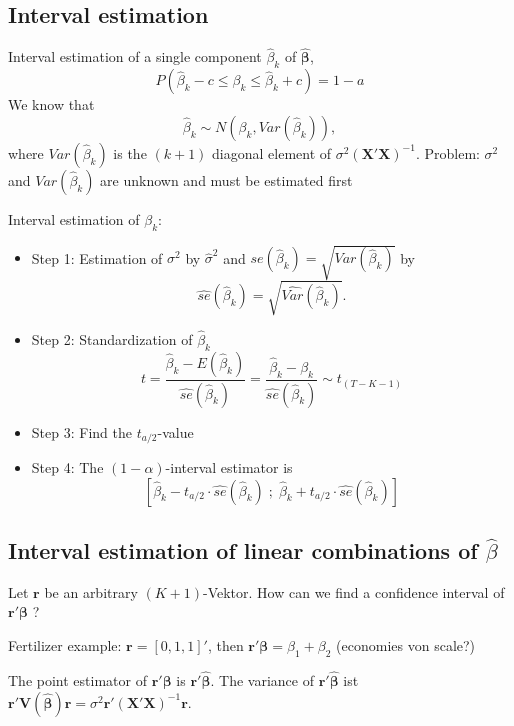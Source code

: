 \documentclass{article}
\begin{document}
\subsection*{Interval estimation}

Interval estimation of a single component $\hat{\beta}_{k}$ of $\mathbf{\hat{\beta}}$,
\[ P\left( \hat{\beta}_{k}-c\leq \beta _{k}\leq \hat{\beta}_{k}+c\right) =1-a \]
We know that
\[ \hat{\beta}_{k}\sim N(\beta _{k},Var(\hat{\beta}_{k})), \]
where $Var(\hat{\beta}_{k})$ is the $(k+1)$ diagonal element of 
$\sigma^2(\mathbf{X}'\mathbf{X})^{-1}$. Problem: $\sigma ^{2}$ and $Var(\hat{\beta}_{k})$ are unknown and must be estimated first

Interval estimation of $\beta_k$:
\begin{itemize}
\item Step 1: Estimation of  $\sigma ^{2}$ by $\hat{\sigma}^{2}$ and 
$se(\hat{\beta}_{k})=\sqrt{Var(\hat{\beta}_{k})}$ by
\[ \widehat{se}(\hat{\beta}_{k})=\sqrt{\widehat{Var}(\hat{\beta}_{k})}. \]
\item Step 2: Standardization of $\hat{\beta}_{k}$
\[ t=\frac{\hat{\beta}_{k}-E(\hat{\beta}_{k})}{\widehat{se}(\hat{\beta}_{k})}
=\frac{\hat{\beta}_{k}-\beta _{k}}{\widehat{se}(\hat{\beta}_{k})}\sim t_{(T-K-1)} \]
\item Step 3: Find the $t_{a/2}$-value
\item Step 4: The $(1-\alpha )$-interval estimator is
\[ \left[ \hat{\beta}_{k}-t_{a/2}\cdot \widehat{se}(\hat{\beta}_{k})\;;\;
\hat{\beta}_{k}+t_{a/2}\cdot \widehat{se}(\hat{\beta}_{k})\right] \]
\end{itemize}

\subsection*{Interval estimation of linear combinations of $\hat{\beta}$}

Let $\mathbf{r}$ be an arbitrary $(K+1)$-Vektor. How can we find a confidence interval of $\mathbf{r}'\mathbf{\beta }$ ?

Fertilizer example: $\mathbf{r}=[0,1,1]'$, then $\mathbf{r}'\mathbf{\beta }=\beta _{1}+\beta _{2}$ (economies von scale?)

The point estimator of $\mathbf{r}'\mathbf{\beta }$ is $\mathbf{r}'\mathbf{\hat{\beta}}$. The variance of $\mathbf{r}'\mathbf{\hat{\beta}}$ ist
$\mathbf{r}'\mathbf{V}(\mathbf{\hat{\beta}})\mathbf{r}=\sigma ^{2}
\mathbf{r}'(\mathbf{X}'\mathbf{X})^{-1}\mathbf{r}$.
\end{document}
